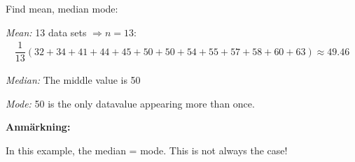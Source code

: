 \noindent Find mean, median mode:\par
\textit{Mean:} 13 data sets $\Rightarrow n = 13$:
\begin{equation*}
  \begin{gathered}
    \dfrac{1}{13}(32+34+41+44+45+50+50+54+55+57+58+60+63) \approx 49.46
  \end{gathered}
\end{equation*}\par
\textit{Median:} The middle value is 50\par
\textit{Mode:} 50 is the only datavalue appearing more than once. 
\par\bigskip
\noindent\textbf{Anmärkning:}\par
\noindent In this example, the median = mode. This is not always the case!
\par\bigskip

